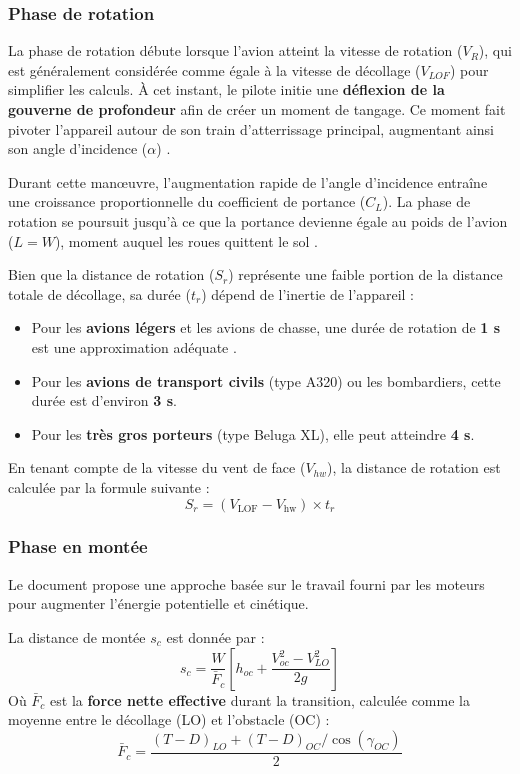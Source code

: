  		\subsubsection{Phase de rotation}
 		
 		La phase de rotation débute lorsque l'avion atteint la vitesse de rotation ($V_R$),
 		qui est généralement considérée comme égale à la vitesse de décollage ($V_{LOF}$) 
 		pour simplifier les calculs. À cet instant, le pilote initie une \textbf{déflexion
 		de la gouverne de profondeur} afin de créer un moment de tangage. Ce moment fait 
 		pivoter l'appareil autour de son train d'atterrissage principal, augmentant ainsi son angle d'incidence ($\alpha$) .
 		
 		Durant cette manœuvre, l'augmentation rapide de l'angle d'incidence entraîne une 
 		croissance proportionnelle du coefficient de portance ($C_L$). La phase de rotation se 
 		poursuit jusqu'à ce que la portance devienne égale au poids de l'avion ($L=W$), moment auquel les roues quittent le sol .
 		
 		Bien que la distance de rotation ($S_r$) représente une faible portion 
 		de la distance totale de décollage, sa durée ($t_r$) dépend de l'inertie de l'appareil :
 		\begin{itemize}
 			\item Pour les \textbf{avions légers} et les avions de chasse, une durée de rotation de \textbf{1 s} est une approximation adéquate .
 			\item Pour les \textbf{avions de transport civils} (type A320) ou les bombardiers, cette durée est d'environ \textbf{3 s}.
 			\item Pour les \textbf{très gros porteurs} (type Beluga XL), elle peut atteindre \textbf{4 s}.
 		\end{itemize}
 		
 		En tenant compte de la vitesse du vent de face ($V_{hw}$), la distance de rotation est calculée par la formule suivante :
 		\[
 		S_r = (V_{\text{LOF}} - V_{\text{hw}}) \times t_r
 		\]
 	
 	
 		\subsubsection{Phase en montée}
 		Le document \cite{War:09} propose une approche basée sur le travail fourni par les moteurs pour augmenter l'énergie potentielle et cinétique.
 		
 		La distance de montée $s_c$ est donnée par :
 		\[
 		s_c = \frac{W}{\bar{F}_c} \left[ h_{oc} + \frac{V_{oc}^2 - V_{LO}^2}{2g} \right]
 		\]
 		Où $\bar{F}_c$ est la \textbf{force nette effective} durant la transition, calculée comme la moyenne entre le décollage (LO) et l'obstacle (OC) :
 		\[
 		\bar{F}_c = \frac{(T - D)_{LO} + (T - D)_{OC} / \cos(\gamma_{OC})}{2} 
 		\]
 		
